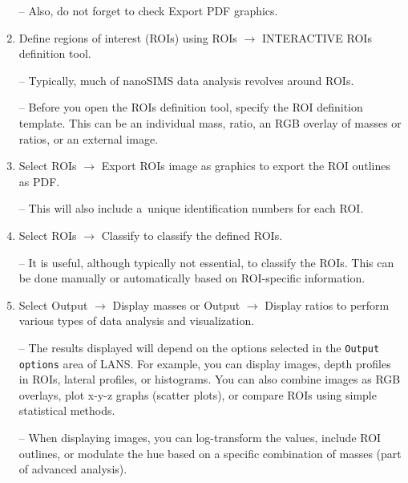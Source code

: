 \documentclass[a4paper, 11pt]{article}
\newcommand{\ttt}[1]{\texttt{#1}}
\newcommand{\lans}[1]{{\color{magenta}#1}}
\newcommand{\lanscb}[1]{{\color{darkgreen}#1}}
\newcommand{\lanstf}[1]{{\color{cyan}#1}}
\newcommand\ra{\rightarrow}
\newcommand\addon[1]{-- {\small #1}}
\begin{document}
\begin{enumerate}
\addon{Also, do not forget to check \lanscb{Export PDF graphics}.}

\item Define regions of interest (ROIs) using \lans{ROIs} $\ra$ \lans{INTERACTIVE ROIs definition tool}.

\addon{Typically, much of nanoSIMS data analysis revolves around ROIs.}

\addon{Before you open the ROIs definition tool, specify the \lanstf{ROI definition template}.  This can be an individual mass, ratio, an RGB overlay of masses or ratios, or an external image.}


\item Select \lans{ROIs} $\ra$ \lans{Export ROIs image as graphics} to export the ROI outlines as PDF. 

\addon{This will also include a~unique identification numbers for each ROI.}

\item Select \lans{ROIs} $\ra$ \lans{Classify} to classify the defined ROIs. 

\addon{It is useful, although typically not essential, to classify the ROIs. This can be done \lans{manually} or \lans{automatically} based on ROI-specific information.}

\item Select \lans{Output} $\ra$ \lans{Display masses} or \lans{Output} $\ra$ \lans{Display ratios} to perform various types of data analysis and visualization.

\addon{The results displayed will depend on the options selected in the \ttt{Output options} area of LANS. For example, you can display \lanscb{images}, \lanscb{depth profiles in ROIs}, \lanscb{lateral profiles}, or \lanscb{histograms}. You can also \lanscb{combine images as RGB} overlays, \lanscb{plot x-y-z graphs} (scatter plots), or \lanscb{compare ROIs} using simple statistical methods.}


\addon{When displaying images, you can \lanscb{log-transform} the values, \lanscb{include ROI outlines}, or \lanscb{modulate the hue} based on a specific combination of masses (part of advanced analysis).}


\end{enumerate}
\end{document}
